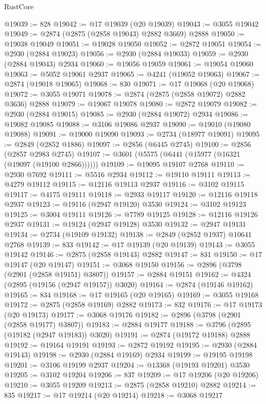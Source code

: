 \begin{lexlean}{RustCore}
\begin{coremodule}
@19039 := 828
@19042 := @17 @19039 (@20 @19039)
@19043 := @3055 @19042
@19049 := @2874 (@2875 (@2858 @19043) @2882 @3669) @2888
@19050 := @19038 @19049
@19051 := @19028 @19050
@19052 := @2872 @19051
@19054 := @2930 (@2884 @19023)
@19056 := @2930 (@2884 @19033)
@19059 := @2930 (@2884 @19043) @2934
@19060 := @19056 @19059
@19061 := @19054 @19060
@19063 := @5052 @19061 @2937
@19065 := @4241 (@19052 @19063)
@19067 := @2874 (@19018 @19065)
@19068 := 830
@19071 := @17 @19068 (@20 @19068)
@19072 := @3055 @19071
@19078 := @2874 (@2875 (@2858 @19072) @2882 @3636) @2888
@19079 := @19067 @19078
@19080 := @2872 @19079
@19082 := @2930 (@2884 @19015)
@19085 := @2930 (@2884 @19072) @2934
@19086 := @19082 @19085
@19088 := @3106 @19086 @2937
@19090 := @19010 (@19080 @19088)
@19091 := @19000 @19090
@19093 := @2734 (@18977 @19091)
@19095 := @2849 (@2852 @1886)
@19097 := @2856 (@6445 @2745)
@19100 := @2856 (@2857 @2983 @2745)
@19107 := @3601 (@5575 (@6441 (@15977 (@16321 (@19097 (@19100 @2866))))))
@19109 := @19095 @19107 @2768
@19110 := @2930 @7692
@19111 := @5516 @2934
@19112 := @19110 @19111
@19113 := @4279 @19112
@19115 := @12116 @19113 @2937
@19116 := @3102 @19115
@19117 := @4175 @19111
@19118 := @2933 @19117
@19120 := @12116 @19118 @2937
@19123 := @19116 (@2947 @19120) @3530
@19124 := @3102 @19123
@19125 := @3004 @19111
@19126 := @7789 @19125
@19128 := @12116 @19126 @2937
@19131 := @19124 (@2947 @19128) @3530
@19132 := @2947 @19131
@19134 := @2734 (@19109 @19132)
@19138 := @2849 (@2852 @1937) @10641 @2768
@19139 := 833
@19142 := @17 @19139 (@20 @19139)
@19143 := @3055 @19142
@19146 := @2875 (@2858 @19143) @2882
@19147 := 831
@19150 := @17 @19147 (@20 @19147)
@19151 := @3068 @19150
@19156 := @2896 (@3798 (@2901 (@2858 @19151) @3807))
@19157 := @2884 @19151
@19162 := @4324 (@2895 (@19156 (@2947 @19157)) @3020)
@19164 := @2874 (@19146 @19162)
@19165 := 834
@19168 := @17 @19165 (@20 @19165)
@19169 := @3055 @19168
@19172 := @2875 (@2858 @19169) @2882
@19173 := 832
@19176 := @17 @19173 (@20 @19173)
@19177 := @3068 @19176
@19182 := @2896 (@3798 (@2901 (@2858 @19177) @3807))
@19183 := @2884 @19177
@19188 := @3796 (@2895 (@19182 (@2947 @19183)) @3020)
@19191 := @2874 (@19172 @19188) @2888
@19192 := @19164 @19191
@19193 := @2872 @19192
@19195 := @2930 (@2884 @19143)
@19198 := @2930 (@2884 @19169) @2934
@19199 := @19195 @19198
@19201 := @3106 @19199 @2937
@19204 := @13368 (@19193 @19201) @3530
@19205 := @3102 @19204
@19206 := 837
@19209 := @17 @19206 (@20 @19206)
@19210 := @3055 @19209
@19213 := @2875 (@2858 @19210) @2882
@19214 := 835
@19217 := @17 @19214 (@20 @19214)
@19218 := @3068 @19217

\end{coremodule}
\end{lexlean}

